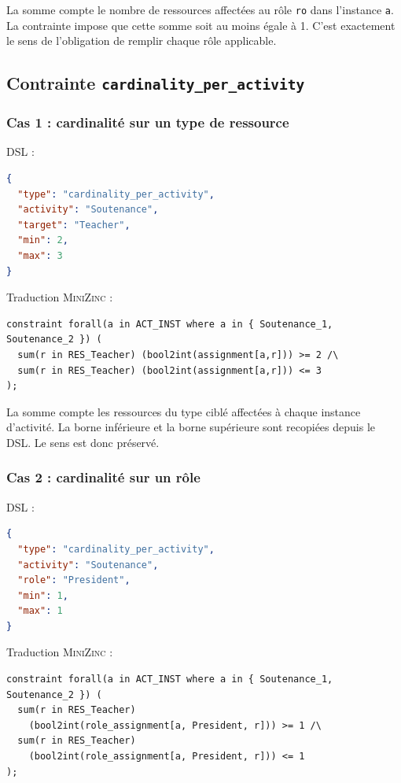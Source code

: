 \documentclass[12pt,a4paper]{article}
\newcommand{\MZN}{\textsc{MiniZinc}}
\begin{document}
La somme compte le nombre de ressources affectées au rôle \texttt{ro} dans l'instance \texttt{a}. La contrainte impose que cette somme soit au moins égale à 1. C'est exactement le sens de l'obligation de remplir chaque rôle applicable.

\subsection{Contrainte \texttt{cardinality\_per\_activity}}

\subsubsection*{Cas 1 : cardinalité sur un type de ressource}

DSL :

\begin{lstlisting}[language=JSON]
{
  "type": "cardinality_per_activity",
  "activity": "Soutenance",
  "target": "Teacher",
  "min": 2,
  "max": 3
}
\end{lstlisting}

Traduction \MZN{} :

\begin{lstlisting}[language=MiniZinc]
constraint forall(a in ACT_INST where a in { Soutenance_1, Soutenance_2 }) (
  sum(r in RES_Teacher) (bool2int(assignment[a,r])) >= 2 /\
  sum(r in RES_Teacher) (bool2int(assignment[a,r])) <= 3
);
\end{lstlisting}

La somme compte les ressources du type ciblé affectées à chaque instance d'activité. La borne inférieure et la borne supérieure sont recopiées depuis le DSL. Le sens est donc préservé.

\subsubsection*{Cas 2 : cardinalité sur un rôle}

DSL :

\begin{lstlisting}[language=JSON]
{
  "type": "cardinality_per_activity",
  "activity": "Soutenance",
  "role": "President",
  "min": 1,
  "max": 1
}
\end{lstlisting}

Traduction \MZN{} :

\begin{lstlisting}[language=MiniZinc]
constraint forall(a in ACT_INST where a in { Soutenance_1, Soutenance_2 }) (
  sum(r in RES_Teacher)
    (bool2int(role_assignment[a, President, r])) >= 1 /\
  sum(r in RES_Teacher)
    (bool2int(role_assignment[a, President, r])) <= 1
);
\end{lstlisting}
\end{document}
